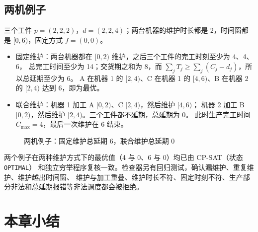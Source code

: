 \documentclass[11pt,oneside,notitlepage]{ctexrep}
\theoremstyle{definition}
\theoremstyle{remark}
\newcommand{\gbar}[5]{%
  \fill[#5] (#2,-#1-0.35) rectangle (#3,-#1+0.35);
  \draw (#2,-#1-0.35) rectangle (#3,-#1+0.35);
  \node[font=\small] at ({(#2+#3)/2},-#1) {#4};}
\newcommand{\gaxis}[2]{%
  \draw[->] (0,-#1-0.55) -- (#2+0.4,-#1-0.55);
  \foreach \t in {0,...,#2} {\draw (\t,-#1-0.55) -- (\t,-#1-0.65); \node[font=\scriptsize,below] at (\t,-#1-0.6) {\t};}}
\begin{document}
\subsection{两机例子}

三个工件 $p=(2,2,2)$，$d=(2,2,4)$；两台机器的维护时长都是 2，时间窗都是 $[0,6)$，固定方式 $f=(0,0)$。
\begin{itemize}[nosep]
  \item 固定维护：两台机器都在 $[0,2)$ 维护，之后三个工件的完工时刻至少为 4、4、6，
        总完工时间至少为 14；交货期之和为 8，而 $\sum_jT_j\ge\sum_j(C_j-d_j)$，所以总延期至少为 6。
        A 在机器 1 的 $[2,4)$、C 在机器 1 的 $[4,6)$、B 在机器 2 的 $[2,4)$ 达到 6，即为最优。
  \item 联合维护：机器 1 加工 A $[0,2)$、C $[2,4)$，然后维护 $[4,6)$；
        机器 2 加工 B $[0,2)$，然后维护 $[2,4)$。三个工件都不延期，总延期为 0。
        此时生产完工时间 $C_{\max}=4$，最后一次维护在 6 结束。
\end{itemize}

\begin{figure}[h]
\centering
{}
\caption{两机例子：固定维护总延期 6，联合维护总延期 0}
\end{figure}

两个例子在两种维护方式下的最优值（4 与 0、6 与 0）均已由 CP-SAT（状态 \texttt{OPTIMAL}）
和独立穷举程序复核一致。检查器另有回归测试，确认漏维护、重复维护、维护越出时间窗、
维护与加工重叠、维护时长不符、固定时刻不符、生产部分非法和总延期报错等非法调度都会被拒绝。

\section{本章小结}
\end{document}
